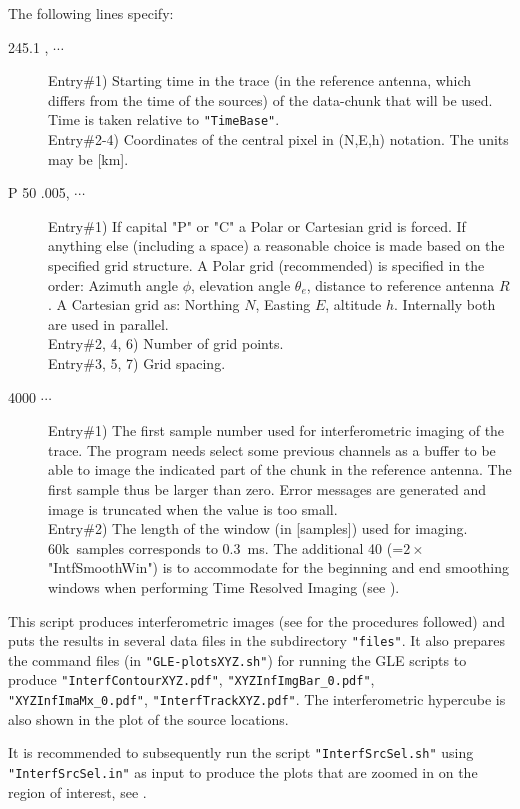 The following lines specify:
\begin{description}
\item[245.1 , $\cdots$]
   Entry\#1) Starting time in the trace (in the reference antenna, which differs from the time of the sources) of the data-chunk that will be used. Time is taken relative to \verb!"TimeBase"!.
   \\Entry\#2-4) Coordinates of the central pixel in (N,E,h) notation. The units may be [km].
\item[P  50 .005, $\cdots$]
   Entry\#1) If capital "P" or "C" a Polar or Cartesian grid is forced. If anything else (including a space) a reasonable choice is made based on the specified grid structure. A Polar grid (recommended) is specified in the order: Azimuth angle $\phi$, elevation angle $\theta_e$, distance to reference antenna $R$. A Cartesian grid as: Northing $N$, Easting $E$, altitude $h$. Internally both are used in parallel.
   \\Entry\#2, 4, 6) Number of grid points.
   \\Entry\#3, 5, 7) Grid spacing.
\item[4000  $\cdots$]
   Entry\#1) The first sample number used for interferometric imaging of the trace. The program needs select some previous channels as a buffer to be able to image the indicated part of the chunk in the reference antenna. The first sample thus be larger than zero. Error messages are generated and image is truncated when the value is too small.
   \\Entry\#2) The length of the window (in [samples]) used for imaging. 60k~samples corresponds to 0.3~ms. The additional 40 (=$2\times$"IntfSmoothWin") is to accommodate for the beginning and end smoothing windows when performing Time Resolved Imaging (see ).
\end{description}


This script produces interferometric images (see  for the procedures followed)
and puts the results in several data files in the subdirectory \verb!"files"!. It also prepares the command files (in \verb!"GLE-plotsXYZ.sh"!) for running the GLE scripts \cite{GLE} to produce \verb!"InterfContourXYZ.pdf"!, \verb!"XYZInfImgBar_0.pdf"!, \verb!"XYZInfImaMx_0.pdf"!, \verb!"InterfTrackXYZ.pdf"!. The interferometric hypercube is also shown in the plot of the source locations.

It is recommended to subsequently run the script \verb!"InterfSrcSel.sh"! using \verb!"InterfSrcSel.in"! as input to produce the plots that are zoomed in on the region of interest, see .

